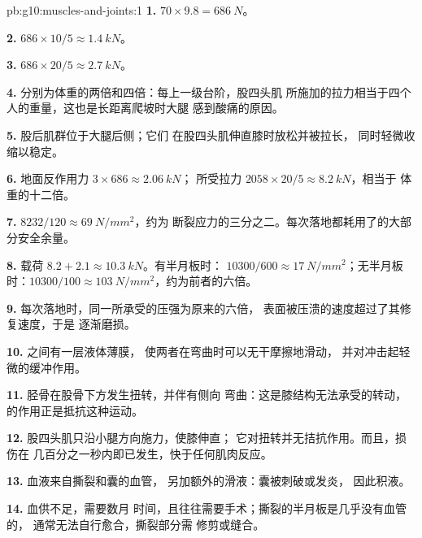 \begin{solution}{pb:g10:muscles-and-joints:1}
\textbf{1.} $70 \times 9.8 = \qty{686}{N}$。

\textbf{2.} $686 \times 10/5 \approx \qty{1.4}{kN}$。

\textbf{3.} $686 \times 20/5 \approx \qty{2.7}{kN}$。

\textbf{4.} 分别为体重的两倍和四倍：每上一级台阶，股四头肌
所施加的拉力相当于四个人的重量，这也是长距离爬坡时大腿
感到酸痛的原因。

\textbf{5.} 股后肌群位于大腿后侧；它们
在股四头肌伸直膝时放松并被拉长，
同时轻微收缩以稳定。

\textbf{6.} 地面反作用力 $3 \times 686 \approx \qty{2.06}{kN}$；
所受拉力 $2058 \times 20/5 \approx \qty{8.2}{kN}$，相当于
体重的十二倍。

\textbf{7.} $8232/120 \approx \qty{69}{N/mm^2}$，约为
断裂应力的三分之二。每次落地都耗用了的大部分安全余量。

\textbf{8.} 载荷 $8.2 + 2.1 \approx \qty{10.3}{kN}$。有半月板时：
$10300/600 \approx \qty{17}{N/mm^2}$；无半月板时：$10300/100 \approx
\qty{103}{N/mm^2}$，约为前者的六倍。

\textbf{9.} 每次落地时，同一所承受的压强为原来的六倍，
表面被压溃的速度超过了其修复速度，于是
逐渐磨损。

\textbf{10.} 之间有一层液体薄膜，
使两者在弯曲时可以无干摩擦地滑动，
并对冲击起轻微的缓冲作用。

\textbf{11.} 胫骨在股骨下方发生扭转，并伴有侧向
弯曲：这是膝结构无法承受的转动，
的作用正是抵抗这种运动。

\textbf{12.} 股四头肌只沿小腿方向施力，使膝伸直；
它对扭转并无拮抗作用。而且，损伤在
几百分之一秒内即已发生，快于任何肌肉反应。

\textbf{13.} 血液来自撕裂和囊的血管，
另加额外的滑液：囊被刺破或发炎，
因此积液。

\textbf{14.} 血供不足，需要数月
时间，且往往需要手术；撕裂的半月板是几乎没有血管的，
通常无法自行愈合，撕裂部分需
修剪或缝合。


\end{solution}

